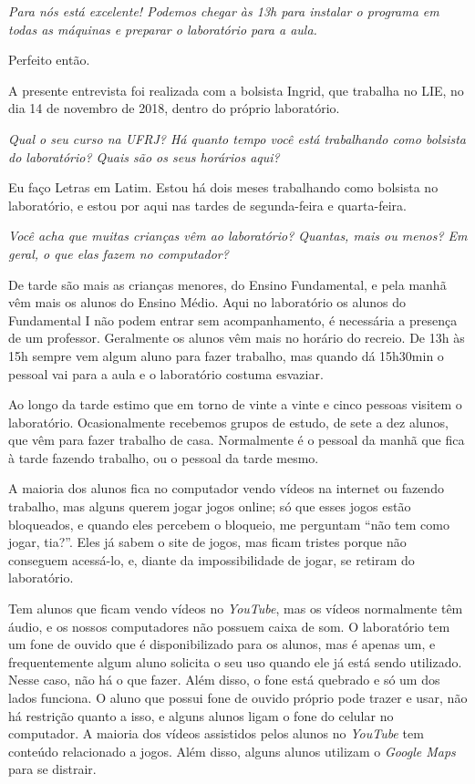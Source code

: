 \textit{Para nós está excelente! Podemos chegar às 13h para instalar o programa em todas as máquinas e preparar o laboratório para a aula.}

Perfeito então.

\label{anx:LABEL_ANX_D}

A presente entrevista foi realizada com a bolsista Ingrid, que trabalha no LIE, no dia 14 de novembro de 2018, dentro do próprio laboratório.

\textit{Qual o seu curso na UFRJ? Há quanto tempo você está trabalhando como bolsista do laboratório? Quais são os seus horários aqui?}

Eu faço Letras em Latim. Estou há dois meses trabalhando como bolsista no laboratório, e estou por aqui nas tardes de segunda-feira e quarta-feira.

\textit{Você acha que muitas crianças vêm ao laboratório? Quantas, mais ou menos? Em geral, o que elas fazem no computador?}

De tarde são mais as crianças menores, do Ensino Fundamental, e pela manhã vêm mais os alunos do Ensino Médio. Aqui no laboratório os alunos do Fundamental I não podem entrar sem acompanhamento, é necessária a presença de um professor. Geralmente os alunos vêm mais no horário do recreio. De 13h às 15h sempre vem algum aluno para fazer trabalho, mas quando dá 15h30min o pessoal vai para a aula e o laboratório costuma esvaziar.

Ao longo da tarde estimo que em torno de vinte a vinte e cinco pessoas visitem o laboratório. Ocasionalmente recebemos grupos de estudo, de sete a dez alunos, que vêm para fazer trabalho de casa. Normalmente é o pessoal da manhã que fica à tarde fazendo trabalho, ou o pessoal da tarde mesmo.

A maioria dos alunos fica no computador vendo vídeos na internet ou fazendo trabalho, mas alguns querem jogar jogos online; só que esses jogos estão bloqueados, e quando eles percebem o bloqueio, me perguntam “não tem como jogar, tia?”. Eles já sabem o site de jogos, mas ficam tristes porque não conseguem acessá-lo, e, diante da impossibilidade de jogar, se retiram do laboratório.

Tem alunos que ficam vendo vídeos no \textit{YouTube}, mas os vídeos normalmente têm áudio, e os nossos computadores não possuem caixa de som. O laboratório tem um fone de ouvido que é disponibilizado para os alunos, mas é apenas um, e frequentemente algum aluno solicita o seu uso quando ele já está sendo utilizado. Nesse caso, não há o que fazer. Além disso, o fone está quebrado e só um dos lados funciona. O aluno que possui fone de ouvido próprio pode trazer e usar, não há restrição quanto a isso, e alguns alunos ligam o fone do celular no computador. A maioria dos vídeos assistidos pelos alunos no \textit{YouTube} tem conteúdo relacionado a jogos. Além disso, alguns alunos utilizam o \textit{Google Maps} para se distrair.

